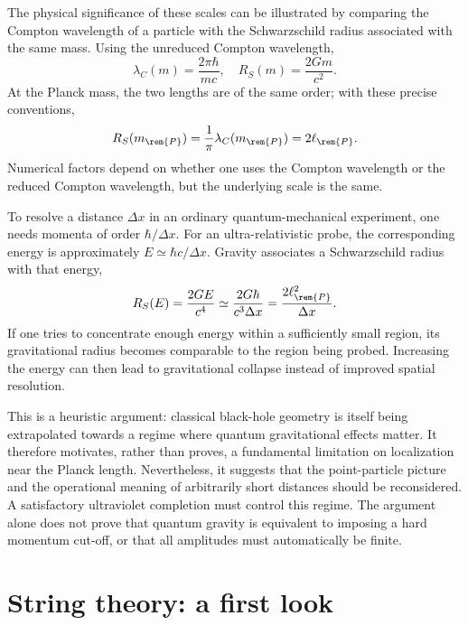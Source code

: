 The physical significance of these scales can be illustrated by comparing the Compton wavelength of a particle with the Schwarzschild radius associated with the same mass. Using the unreduced Compton wavelength,
\begin{equation}
    \lambda_C(m) = \frac{2\pi\hbar}{mc},\quad R_S(m) = \frac{2Gm}{c^2}.
\end{equation}
At the Planck mass, the two lengths are of the same order; with these precise conventions,
\begin{equation}
    R_S(m_{\rem{P}}) = \frac{1}{\pi}\lambda_C(m_{\rem{P}}) = 2\ell_{\rem{P}}.
\end{equation}
Numerical factors depend on whether one uses the Compton wavelength or the reduced Compton wavelength, but the underlying scale is the same.

To resolve a distance $\Delta x$ in an ordinary quantum-mechanical experiment, one needs momenta of order $\hbar/\Delta x$. For an ultra-relativistic probe, the corresponding energy is approximately $E\simeq\hbar c/\Delta x$. Gravity associates a Schwarzschild radius with that energy,
\begin{equation}
    R_S(E) = \frac{2GE}{c^4}\simeq\frac{2G\hbar}{c^3\Delta x} = \frac{2\ell_{\rem{P}}^2}{\Delta x}.
\end{equation}
If one tries to concentrate enough energy within a sufficiently small region, its gravitational radius becomes comparable to the region being probed. Increasing the energy can then lead to gravitational collapse instead of improved spatial resolution.

This is a heuristic argument: classical black-hole geometry is itself being extrapolated towards a regime where quantum gravitational effects matter. It therefore motivates, rather than proves, a fundamental limitation on localization near the Planck length. Nevertheless, it suggests that the point-particle picture and the operational meaning of arbitrarily short distances should be reconsidered. A satisfactory ultraviolet completion must control this regime. The argument alone does not prove that quantum gravity is equivalent to imposing a hard momentum cut-off, or that all amplitudes must automatically be finite.

\section{String theory: a first look}


